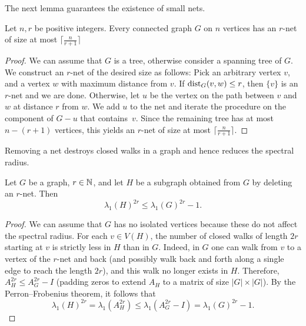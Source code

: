The next lemma guarantees the existence of small nets.
\begin{lemma} \label{lem:small-r-net}
    Let $n, r$ be positive integers. Every connected graph $G$ on $n$ vertices has an $r$-net of size at most $\lceil \frac{n}{r + 1} \rceil$
\end{lemma}

\begin{proof}
    We can assume that $G$ is a tree, otherwise consider a spanning tree of $G$.
    We construct an $r$-net of the desired size as follows:
    Pick an arbitrary vertex $v$, and a vertex $w$ with maximum distance from $v$. 
    If $\operatorname{dist}_G (v, w) \le r$, then $\{ v \}$ is an $r$-net and we are done.
    Otherwise, let $u$ be the vertex on the path between $v$ and $w$ at distance $r$ from $w$. 
    We add $u$ to the net and iterate the procedure on the component of $G - u$ that \mbox{contains $v$}. 
    Since the remaining tree has at most $n - (r + 1)$ vertices, this yields an $r$-net of size at most $\lceil \frac{n}{r + 1} \rceil$.
\end{proof}

Removing a net destroys closed walks in a graph and hence reduces the spectral radius.

\begin{lemma} \label{lem:net-removal}
    Let $G$ be a graph, $r \in \mathbb{N}$, and let $H$ be a subgraph obtained from $G$ by deleting an $r$-net. 
    Then 
    \begin{equation*}
        \lambda_1 (H)^{2r} \le \lambda_1 (G)^{2r} - 1.
    \end{equation*}
\end{lemma}

\begin{proof}
    We can assume that $G$ has no isolated vertices because these do not affect the spectral radius.
    For each $v \in V(H)$, the number of closed walks of length $2r$ starting at $v$ is strictly less in $H$ than in $G$. 
    Indeed, in $G$ one can walk from $v$ to a vertex of the $r$-net and back (and possibly walk back and forth along a single edge to reach the length $2r$), and this walk no longer exists in $H$.
    Therefore, $A_H^{2r} \le A_G^{2r} - I$ (padding zeros to extend $A_H$ to a matrix of size $|G| \times |G|$). 
    By the Perron--Frobenius theorem, it follows that 
    \begin{equation*}
        \lambda_1 (H)^{2r} = \lambda_1 ( A_H ^{2r}) \le \lambda_1 ( A_G ^{2r} - I) = \lambda_1 (G)^{2r} - 1.
    \end{equation*}
\end{proof}

